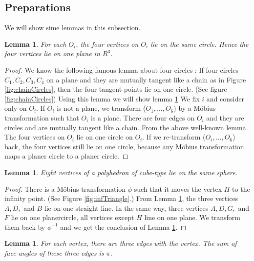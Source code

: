 \documentclass[dvipdfmx]{interact}
\theoremstyle{plain}%
\newtheorem{lemma}[theorem]{Lemma}
\theoremstyle{definition}
\theoremstyle{remark}
\theoremstyle{problemstyle}
\begin{document}
\subsection{Preparations}

We will show sime lemmas in this subsection.

\begin{lemma}\label{sameCircle}
For each $O_i$, the four vertices on $O_i$ lie on the same circle.
Hence the four vertices lie on one plane in $R^3$.
\end{lemma}

\begin{proof}
 We know the following famous lemma about four circles : If four circles 
 $C_1, C_2, C_3, C_4$ on a plane and they are mutually tangent like a
 chain as in Figure \ref{fig:chainCircles}, then the four tangent points lie on one circle.
 (See figure \ref{fig:chainCircles}) Using this lemma we will show lemma \ref{sameCircle} We fix $i$ and
 consider only on $O_i$. If $O_i$ is not a plane, we transform 
 ($O_1, ..., O_6$) by a M\"obius transformation such that $O_i$ is a
 plane. There are four edges on $O_i$ and they are circles and are
 mutually tangent like a chain. From the above well-known lemma. The
 four vertices on $O_i$ lie on one circle on $O_i$. If we re-transform
 ($O_i, ..., O_6$) back, the four vertices still lie on one circle,
 because any M\"obius transformation maps a planer circle to a planer circle.
\end{proof}

\begin{lemma}\label{eightVertices}
 Eight vertices of a polyhedron of cube-type lie on the same sphere.
\end{lemma}

\begin{proof}
 There is a M\"obius transformation $\phi$ such that it moves the vertex
 $H$ to the infinity point. (See Figure \ref{fig:infTriangle}.) From Lemma \ref{sameCircle}, the three
 vertices $A, D,$ and $B$ lie on one straight line. In the same way,
 three vertices $A, D, G,$ and $F$ lie on one planercircle, all vertices
 except $H$ line on one plane. We transform them back by $\phi^{-1}$ and
 we get the conclusion of Lemma \ref{eightVertices}.
\end{proof}

\begin{lemma}\label{sum}
 For each vertex, there are three edges with the vertex. The sum of
 face-angles of these three edges is $\pi$.
\end{lemma}
\end{document}
